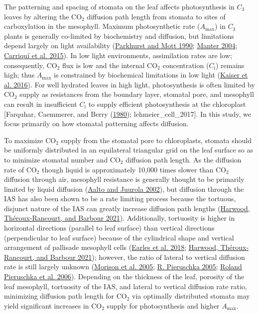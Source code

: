 \documentclass[12pt,halfline,a4paper,]{ouparticle}
\begin{document}
The patterning and spacing of stomata on the leaf affects photosynthesis
in \(C_3\) leaves by altering the CO\(_2\) diffusion path length from
stomata to sites of carboxylation in the mesophyll. Maximum
photosynthetic rate (\(A_\text{max}\)) in \(C_3\) plants is generally
co-limited by biochemistry and diffusion, but limitations depend largely
on light availability
(\protect\hyperlink{ref-parkhurst_intercellular_1990}{Parkhurst and Mott
1990}; \protect\hyperlink{ref-manter_ci_2004}{Manter 2004};
\protect\hyperlink{ref-carriqui_diffusional_2015}{Carriquí et al.
2015}). In low light environments, assimilation rates are low;
consequently, CO\(_2\) flux is low and the internal CO\(_2\)
concentration (\(C_\text{i}\)) remains high; thus \(A_\text{max}\) is
constrained by biochemical limitations in low light
(\protect\hyperlink{ref-kaiser_metabolic_2016}{Kaiser et al. 2016}). For
well hydrated leaves in high light, photosynthesis is often limited by
CO\(_2\) supply as resistances from the boundary layer, stomatal pore,
and mesophyll can result in insufficient \(C_\text{i}\) to supply
efficient photosynthesis at the chloroplast {[}Farquhar, Caemmerer, and
Berry (\protect\hyperlink{ref-farquhar_biochemical_1980}{1980});
lehmeier\_cell\_2017{]}. In this study, we focus primarily on how
stomatal patterning affects diffusion.

To maximize CO\(_2\) supply from the stomatal pore to chloroplasts,
stomata should be uniformly distributed in an equilateral triangular
grid on the leaf surface so as to minimize stomatal number and CO\(_2\)
diffusion path length. As the diffusion rate of CO\(_2\) though liquid
is approximately 10,000 times slower than CO\(_2\) diffusion through
air, mesophyll resistance is generally thought to be primarily limited
by liquid diffusion
(\protect\hyperlink{ref-aalto_three-dimensional_2002}{Aalto and Juurola
2002}), but diffusion through the IAS has also been shown to be a rate
limiting process because the tortuous, disjunct nature of the IAS can
greatly increase diffusion path lengths
(\protect\hyperlink{ref-harwood_understanding_2021}{Harwood,
Théroux‐Rancourt, and Barbour 2021}). Additionally, tortuosity is higher
in horizontal directions (parallel to leaf surface) than vertical
directions (perpendicular to leaf surface) because of the cylindrical
shape and vertical arrangement of pallisade mesophyll cells
(\protect\hyperlink{ref-earles_beyond_2018}{Earles et al. 2018};
\protect\hyperlink{ref-harwood_understanding_2021}{Harwood,
Théroux‐Rancourt, and Barbour 2021}); however, the ratio of lateral to
vertical diffusion rate is still largely unknown
(\protect\hyperlink{ref-morison_lateral_2005}{Morison et al. 2005};
\protect\hyperlink{ref-pieruschka_lateral_2005}{R. Pieruschka 2005};
\protect\hyperlink{ref-pieruschka_lateral_2006}{Roland Pieruschka et al.
2006}). Depending on the thickness of the leaf, porosity of the leaf
mesophyll, tortuosity of the IAS, and lateral to vertical diffusion rate
ratio, minimizing diffusion path length for CO\(_2\) via optimally
distributed stomata may yield significant increases in CO\(_2\) supply
for photosynthesis and higher \(A_\text{max}\).
\end{document}
